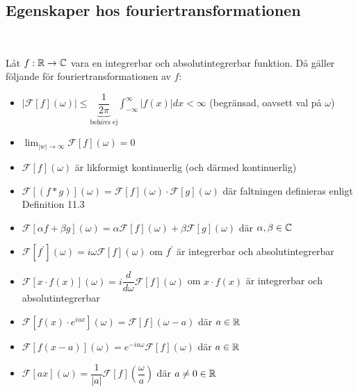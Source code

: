 \subsection{Egenskaper hos fouriertransformationen}\hfill\\\par
\noindent Låt $f:\mathbb{R}\to\mathbb{C}$ vara en integrerbar och absolutintegrerbar funktion. Då gäller följande för fouriertransformationen av $f$:\par
\begin{itemize}
  \item $\left|\mathcal{F}[f](\omega)\right|\leq \underbrace{\dfrac{1}{2\pi}}_{\text{behövs ej}}\int_{-\infty}^{\infty}\left|f(x)\right|dx<\infty$ (begränsad, oavsett val på $\omega$)
    \par\bigskip
  \item $\lim_{\left|w\right|\to\infty}\mathcal{F}[f](\omega) = 0$
    \par\bigskip
  \item $\mathcal{F}[f](\omega)$ är likformigt kontinuerlig (och därmed kontinuerlig)
    \par\bigskip
  \item $\mathcal{F}[(f*g)](\omega) = \mathcal{F}[f](\omega)\cdot\mathcal{F}[g](\omega)$ där faltningen definieras enligt Definition 11.3
    \par\bigskip
  \item $\mathcal{F}[\alpha f+\beta g](\omega) = \alpha\mathcal{F}[f](\omega)+\beta\mathcal{F}[g](\omega)$ där $\alpha, \beta\in\mathbb{C}$
    \par\bigskip
  \item $\mathcal{F}[f^{\prime}](\omega) = i\omega\mathcal{F}[f](\omega)$ om $f^{\prime}$ är integrerbar och absolutintegrerbar
    \par\bigskip
  \item $\mathcal{F}[x\cdot f(x)](\omega) = i\dfrac{d}{d\omega}\mathcal{F}[f](\omega)$ om $x\cdot f(x)$ är integrerbar och absolutintegrerbar
    \par\bigskip
  \item $\mathcal{F}[f(x)\cdot e^{iax}](\omega) = \mathcal{F}[f](\omega-a)$ där $a\in\mathbb{R}$
    \par\bigskip
  \item $\mathcal{F}[f(x-a)](\omega) = e^{-ia\omega}\mathcal{F}[f](\omega)$ där $a\in\mathbb{R}$
    \par\bigskip
  \item $\mathcal{F}[ax](\omega) = \dfrac{1}{\left|a\right|}\mathcal{F}[f]\left(\dfrac{\omega}{a}\right)$ där $a\neq0\in\mathbb{R}$
\end{itemize}
\par\bigskip
\par\bigskip

